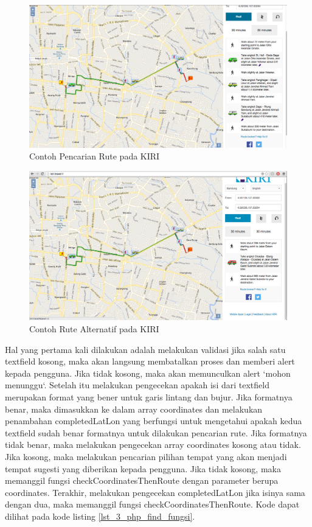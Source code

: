 \documentclass[a4paper,twoside]{article}
\begin{document}
\begin{enumerate}
\begin{figure}[H]
  \centering
  \includegraphics[scale=0.3]{Gambar/KIRI-find}
  \caption{Contoh Pencarian Rute pada KIRI} 
  \label{fig:3_KIRI_find}
\end{figure}

\begin{figure}[H]
  \centering
  \includegraphics[scale=0.3]{Gambar/KIRI-find-alternate}
  \caption{Contoh Rute Alternatif pada KIRI} 
  \label{fig:3_KIRI_find_alternate}
\end{figure}

Hal yang pertama kali dilakukan adalah melakukan validasi jika salah satu textfield kosong, maka akan langsung membatalkan proses dan memberi alert kepada pengguna. Jika tidak kosong, maka akan memunculkan alert `mohon menunggu`. 
Setelah itu melakukan pengecekan apakah isi dari textfield merupakan format yang bener untuk garis lintang dan bujur. Jika formatnya benar, maka dimasukkan ke dalam array coordinates dan melakukan penambahan completedLatLon yang berfungsi untuk mengetahui apakah kedua textfield sudah benar formatnya untuk dilakukan pencarian rute. Jika formatnya tidak benar, maka melakukan pengecekan array coordinates kosong atau tidak. 
Jika kosong, maka melakukan pencarian pilihan tempat yang akan menjadi tempat sugesti yang diberikan kepada pengguna. Jika tidak kosong, maka memanggil fungsi checkCoordinatesThenRoute dengan parameter berupa coordinates. Terakhir, melakukan pengecekan completedLatLon jika isinya sama dengan dua, maka memanggil fungsi checkCoordinatesThenRoute. Kode dapat dilihat pada kode listing \ref{lst_3_php_find_fungsi}.


\end{enumerate}
\end{document}
